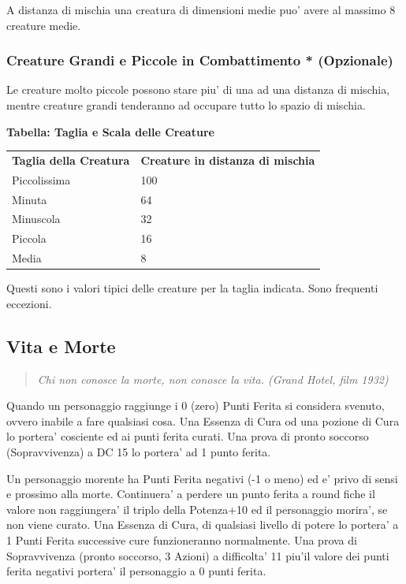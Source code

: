 \documentclass[a4paper,11pt,twoside,openany]{book}
\begin{document}
A distanza di mischia una creatura di dimensioni medie puo' avere al massimo 8 creature medie.


\subsubsection{Creature Grandi e Piccole in Combattimento {*} (Opzionale)}

\label{creature-grandi-e-piccole-in-combattimento-opzionale}

Le creature molto piccole possono stare piu' di una ad una distanza
di mischia, mentre creature grandi tenderanno ad occupare tutto lo
spazio di mischia.
\medskip

\textbf{Tabella: Taglia e Scala delle Creature}

\medskip
\begin{tabular}{ll}
	\toprule 
	\textbf{Taglia della Creatura} & \textbf{Creature in distanza di mischia}\tabularnewline
	Piccolissima & 100\tabularnewline
	Minuta & 64\tabularnewline
	Minuscola & 32\tabularnewline
	Piccola & 16\tabularnewline
	Media & 8\tabularnewline	
\end{tabular}

\smallskip
Questi sono i valori tipici delle creature per la taglia indicata.
Sono frequenti eccezioni.
\bigskip

\pagebreak

\subsection{Vita e Morte}

\label{vita-e-morte}
\begin{quote}\textit{Chi non conosce la morte, non conosce la vita. (Grand Hotel, film 1932)
}\end{quote}

Quando un personaggio raggiunge i 0 (zero) Punti Ferita si considera svenuto, ovvero inabile a fare qualsiasi cosa. Una Essenza di Cura od una pozione di Cura lo portera’ cosciente ed ai punti ferita curati. Una prova di pronto soccorso (Sopravvivenza) a DC 15 lo portera’ ad 1 punto ferita.

Un personaggio morente ha Punti Ferita negativi (-1 o meno) ed e' privo di sensi e prossimo alla morte. Continuera’ a perdere un punto ferita a round fiche il valore non raggiungera’ il triplo della Potenza+10 ed il personaggio morira’, se non viene curato.
Una Essenza di Cura, di qualsiasi livello di potere lo portera’ a 1 Punti Ferita successive cure funzioneranno normalmente.
Una prova di Sopravvivenza (pronto soccorso, 3 Azioni) a difficolta’ 11 piu’il valore dei punti ferita negativi portera’ il personaggio a 0 punti ferita.
\end{document}
